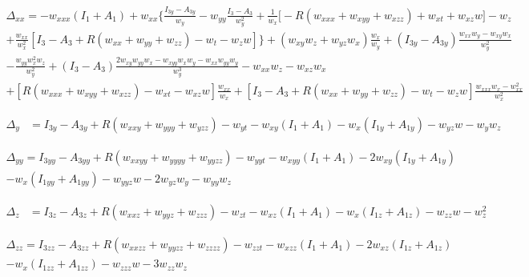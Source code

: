 \documentclass[12pt,a4paper]{article}
\begin{document}
	\begin{multline}
	  \Delta_{xx} = - w_{xxx} \left( I_1 + A_1 \right)
	  + w_{xx} \biggl\{ \frac{I_{3y} - A_{3y}}{w_y} - w_{yy} \frac{I_3 - A_3}{w_y^2} + \frac{1}{w_x} \biggl[ -R \left(w_{xxx} + w_{xyy} + w_{xzz} \right) + w_{xt} + w_{xz} w \biggr] - w_z \\
	  + \frac{w_{xx}}{w_x^2} [ I_3 - A_3 + R \left(w_{xx} + w_{yy} + w_{zz} \right) - w_t - w_z w ] \biggr\}
	  + \left( w_{xy} w_z + w_{yz} w_x \right) \frac{w_x}{w_y}
	  + \left( I_{3y} - A_{3y} \right) \frac{w_{xx} w_y - w_{xy} w_x}{w_y^2} \\
	  - \frac{w_{yy} w_x^2 w_z}{w_y^2}
	  + \left( I_3 - A_3 \right) \frac{2 w_{xy} w_{yy} w_x - w_{xyy} w_x w_y - w_{xx} w_{yy} w_y}{w_y^3}
	- w_{xx} w_z
	  - w_{xz} w_x \\
	  + \left[ R \left(w_{xxx} + w_{xyy} + w_{xzz} \right) - w_{xt} - w_{xz} w \right] \frac{w_{xx}}{w_x}
	  + \left[ I_3 - A_3 + R \left(w_{xx} + w_{yy} + w_{zz} \right) - w_t - w_z w \right] \frac{w_{xxx} w_x - w_{xx}^2}{w_x^2}
	\end{multline}

	\begin{align}
	  \Delta_y &= I_{3y} - A_{3y} + R \left(w_{xxy} + w_{yyy} + w_{yzz} \right) - w_{yt} - w_{xy} \left( I_1 + A_1 \right) - w_x \left( I_{1y} + A_{1y} \right) - w_{yz} w - w_y w_z
	\end{align}

	\begin{multline}
	  \Delta_{yy} = I_{3yy} - A_{3yy} + R \left(w_{xxyy} + w_{yyyy} + w_{yyzz} \right) - w_{yyt} - w_{xyy} \left( I_1 + A_1 \right) - 2 w_{xy} \left( I_{1y} + A_{1y} \right) \\
	   - w_x \left( I_{1yy} + A_{1yy} \right) - w_{yyz} w - 2 w_{yz} w_y - w_{yy} w_z
	\end{multline}

	\begin{align}
	  \Delta_z &= I_{3z} - A_{3z} + R \left(w_{xxz} + w_{yyz} + w_{zzz} \right) - w_{zt} - w_{xz} \left( I_1 + A_1 \right) - w_x \left( I_{1z} + A_{1z} \right) - w_{zz} w - w_z^2
	\end{align}

	\begin{multline}
	  \Delta_{zz} = I_{3zz} - A_{3zz} + R \left(w_{xxzz} + w_{yyzz} + w_{zzzz} \right) - w_{zzt} - w_{xzz} \left( I_1 + A_1 \right) - 2 w_{xz} \left( I_{1z} + A_{1z} \right) \\
	  - w_x \left( I_{1zz} + A_{1zz} \right) - w_{zzz} w - 3 w_{zz} w_z
	\end{multline}
\end{document}
